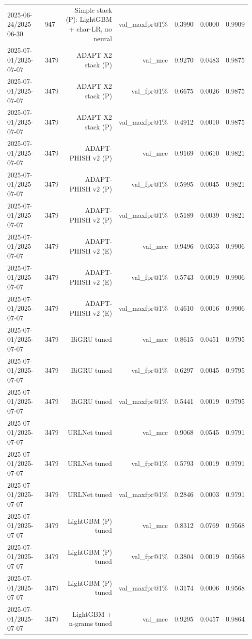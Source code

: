 \begin{table}[t]
\begin{tabular}{llrrrrr}
2025-06-24/2025-06-30 & 947 & Simple stack (P): LightGBM + char-LR, no neural & val\_maxfpr@1\% & 0.3990 & 0.0000 & 0.9909 \\
2025-07-01/2025-07-07 & 3479 & ADAPT-X2 stack (P) & val\_mcc & 0.9270 & 0.0483 & 0.9875 \\
2025-07-01/2025-07-07 & 3479 & ADAPT-X2 stack (P) & val\_fpr@1\% & 0.6675 & 0.0026 & 0.9875 \\
2025-07-01/2025-07-07 & 3479 & ADAPT-X2 stack (P) & val\_maxfpr@1\% & 0.4912 & 0.0010 & 0.9875 \\
2025-07-01/2025-07-07 & 3479 & ADAPT-PHISH v2 (P) & val\_mcc & 0.9169 & 0.0610 & 0.9821 \\
2025-07-01/2025-07-07 & 3479 & ADAPT-PHISH v2 (P) & val\_fpr@1\% & 0.5995 & 0.0045 & 0.9821 \\
2025-07-01/2025-07-07 & 3479 & ADAPT-PHISH v2 (P) & val\_maxfpr@1\% & 0.5189 & 0.0039 & 0.9821 \\
2025-07-01/2025-07-07 & 3479 & ADAPT-PHISH v2 (E) & val\_mcc & 0.9496 & 0.0363 & 0.9906 \\
2025-07-01/2025-07-07 & 3479 & ADAPT-PHISH v2 (E) & val\_fpr@1\% & 0.5743 & 0.0019 & 0.9906 \\
2025-07-01/2025-07-07 & 3479 & ADAPT-PHISH v2 (E) & val\_maxfpr@1\% & 0.4610 & 0.0016 & 0.9906 \\
2025-07-01/2025-07-07 & 3479 & BiGRU tuned & val\_mcc & 0.8615 & 0.0451 & 0.9795 \\
2025-07-01/2025-07-07 & 3479 & BiGRU tuned & val\_fpr@1\% & 0.6297 & 0.0045 & 0.9795 \\
2025-07-01/2025-07-07 & 3479 & BiGRU tuned & val\_maxfpr@1\% & 0.5441 & 0.0019 & 0.9795 \\
2025-07-01/2025-07-07 & 3479 & URLNet tuned & val\_mcc & 0.9068 & 0.0545 & 0.9791 \\
2025-07-01/2025-07-07 & 3479 & URLNet tuned & val\_fpr@1\% & 0.5793 & 0.0019 & 0.9791 \\
2025-07-01/2025-07-07 & 3479 & URLNet tuned & val\_maxfpr@1\% & 0.2846 & 0.0003 & 0.9791 \\
2025-07-01/2025-07-07 & 3479 & LightGBM (P) tuned & val\_mcc & 0.8312 & 0.0769 & 0.9568 \\
2025-07-01/2025-07-07 & 3479 & LightGBM (P) tuned & val\_fpr@1\% & 0.3804 & 0.0019 & 0.9568 \\
2025-07-01/2025-07-07 & 3479 & LightGBM (P) tuned & val\_maxfpr@1\% & 0.3174 & 0.0006 & 0.9568 \\
2025-07-01/2025-07-07 & 3479 & LightGBM + n-grams tuned & val\_mcc & 0.9295 & 0.0457 & 0.9864 \\

\end{tabular}
\end{table}
